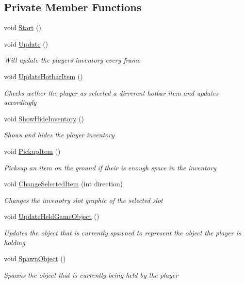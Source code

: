 \subsection*{Private Member Functions}
\begin{DoxyCompactItemize}
\item 
void \hyperlink{class_bee_game_1_1_inventory_1_1_player_inventory_a3cda67cea8a2cae1ce032a8f0d74912a}{Start} ()
\item 
void \hyperlink{class_bee_game_1_1_inventory_1_1_player_inventory_a340eeb707be60a6ecf909728deaad6c5}{Update} ()
\begin{DoxyCompactList}\small\item\em Will update the players inventory every frame \end{DoxyCompactList}\item 
void \hyperlink{class_bee_game_1_1_inventory_1_1_player_inventory_a1b86d5439ebb9f5dc6d9fefe3351cdc7}{Update\+Hotbar\+Item} ()
\begin{DoxyCompactList}\small\item\em Checks wether the player as selected a dirrerent hotbar item and updates accordingly \end{DoxyCompactList}\item 
void \hyperlink{class_bee_game_1_1_inventory_1_1_player_inventory_a226c92d8b805827199cdd1ed9796a326}{Show\+Hide\+Inventory} ()
\begin{DoxyCompactList}\small\item\em Shows and hides the player inventory \end{DoxyCompactList}\item 
void \hyperlink{class_bee_game_1_1_inventory_1_1_player_inventory_a84caefeadcff40e4fd6e888307a7a1e9}{Pickup\+Item} ()
\begin{DoxyCompactList}\small\item\em Picksup an item on the ground if their is enough space in the inventory \end{DoxyCompactList}\item 
void \hyperlink{class_bee_game_1_1_inventory_1_1_player_inventory_a95bef0a0a994161176a5034fb9bc3444}{Change\+Selected\+Item} (int direction)
\begin{DoxyCompactList}\small\item\em Changes the invenotry slot graphic of the selected slot \end{DoxyCompactList}\item 
void \hyperlink{class_bee_game_1_1_inventory_1_1_player_inventory_a469e47caa8a5bbb4fad1fdd5ec5b4113}{Update\+Held\+Game\+Object} ()
\begin{DoxyCompactList}\small\item\em Updates the object that is currently spawned to represent the object the player is holding \end{DoxyCompactList}\item 
void \hyperlink{class_bee_game_1_1_inventory_1_1_player_inventory_a0e00b423e304507a227ed84df2b6039c}{Spawn\+Object} ()
\begin{DoxyCompactList}\small\item\em Spawns the object that is currently being held by the player \end{DoxyCompactList}\end{DoxyCompactItemize}
